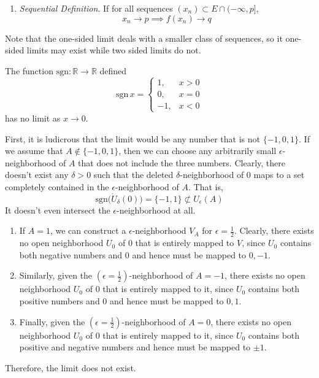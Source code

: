 \begin{definition}
\begin{enumerate}
\begin{enumerate}
          \item \textit{Sequential Definition}. If for all sequences $(x_n) \subset E \cap (-\infty, p]$, 
            \begin{equation}
              x_n \to p \implies f(x_n) \to q
            \end{equation}
        \end{enumerate}
    \end{enumerate}
  \end{definition}

  Note that the one-sided limit deals with a smaller class of sequences, so it one-sided limits may exist while two sided limits do not. 

  \begin{example}
    \label{ex:limit-of-the-signum-function}
    The function $\mathrm{sgn}: \mathbb{R} \to \mathbb{R}$ defined
    \begin{equation}
      \mathrm{sgn}\,x = \begin{cases} 1, & x > 0 \\ 0, & x = 0 \\ -1, & x < 0 \end{cases}
    \end{equation}
    has no limit as $x \to 0$. 

    First, it is ludicrous that the limit would be any number that is not $\{-1, 0, 1\}$. If we assume that $A \not\in \{-1,0,1\}$, then we can choose any arbitrarily small $\epsilon$-neighborhood of $A$ that does not include the three numbers. Clearly, there doesn't exist any $\delta>0$ such that the deleted $\delta$-neighborhood of $0$ maps to a set completely contained in the $\epsilon$-neighborhood of $A$. That is,
    \begin{equation}
      \text{sgn}\big( \mathring{U}_\delta (0)\big) = \{-1,1\} \not\subset U_\epsilon (A)
    \end{equation}
    It doesn't even intersect the $\epsilon$-neighborhood at all. 
    \begin{enumerate}
      \item If $A = 1$, we can construct a $\epsilon$-neighborhood $V_A$ for $\epsilon = \frac{1}{2}$. Clearly, there exists no open neighborhood $U_0$ of $0$ that is entirely mapped to $V$, since $U_0$ contains both negative numbers and $0$ and hence must be mapped to $0, -1$. 
      \item Similarly, given the $(\epsilon=\frac{1}{2})$-neighborhood of $A = -1$, there exists no open neighborhood $U_0$ of $0$ that is entirely mapped to it, since $U_0$ contains both positive numbers and $0$ and hence must be mapped to $0, 1$. 
      \item Finally, given the $(\epsilon=\frac{1}{2})$-neighborhood of $A = 0$, there exists no open neighborhood $U_0$ of $0$ that is entirely mapped to it, since $U_0$ contains both positive and negative numbers and hence must be mapped to $\pm1$. 
    \end{enumerate}
    Therefore, the limit does not exist. 
  \end{example}

